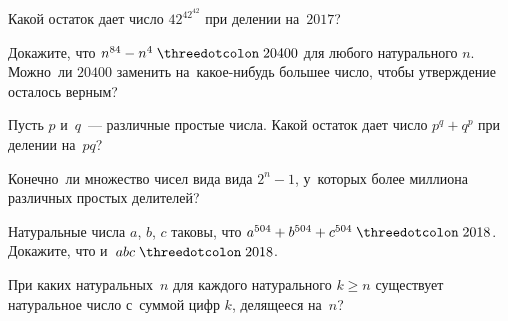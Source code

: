 \begin{problems}
\item
Какой остаток дает число $42^{42^{42}}$ при делении на~$2017$?

\item
\subproblem
Докажите, что $n^{84} - n^{4} \kratno 20400$ для любого натурального $n$.
\\
\subproblem
Можно~ли $20400$ заменить на~какое-нибудь большее число, чтобы утверждение
осталось верным?

\item
Пусть $p$ и~$q$~--- различные простые числа.
Какой остаток дает число $p^{q} + q^{p}$ при делении на~$p q$?

\item
Конечно~ли множество чисел вида вида $2^{n} - 1$, у~которых более миллиона
различных простых делителей?


\item
Натуральные числа $a$, $b$, $c$ таковы, что
\( a^{504} + b^{504} + c^{504} \kratno 2018 \).
Докажите, что и~$a b c \kratno 2018$.


\item
При каких натуральных~$n$ для каждого натурального $k \geq n$ существует
натуральное число с~суммой цифр $k$, делящееся на~$n$?



\end{problems}

\endgroup %

